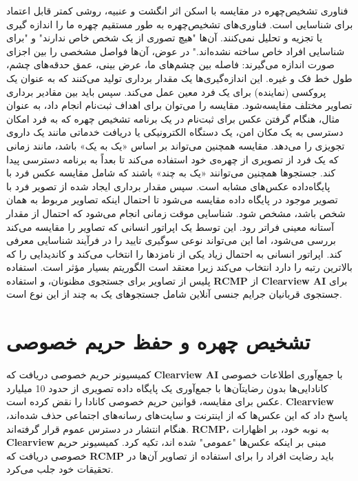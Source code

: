 فناوری تشخیص‌چهره در مقایسه با اسکن اثر انگشت و عنبیه، روشی کمتر قابل اعتماد برای شناسایی است.
فناوری‌های تشخیص‌چهره به طور مستقیم چهره ما را اندازه گیری یا تجزیه و تحلیل نمی‌کنند.
آن‌ها "هیچ تصوری از یک شخص خاص ندارند" و "برای شناسایی افراد خاص ساخته نشده‌اند." در عوض، آن‌ها فواصل مشخصی را بین اجزای صورت اندازه می‌گیرند: فاصله بین چشم‌های ما، عرض بینی، عمق حدقه‌های چشم، طول خط فک و غیره.
این اندازه‌گیری‌ها یک مقدار برداری تولید می‌کنند که به عنوان یک پروکسی (نماینده) برای یک فرد معین عمل می‌کند.
سپس باید بین مقادیر برداری تصاویر مختلف مقایسه‌شود.
مقایسه را می‌توان برای اهداف ثبت‌نام انجام داد، به عنوان مثال، هنگام گرفتن عکس برای ثبت‌نام در یک برنامه تشخیص چهره که به فرد امکان دسترسی به یک مکان امن، یک دستگاه الکترونیکی یا دریافت خدماتی مانند یک داروی تجویزی را می‌دهد.
مقایسه همچنین می‌تواند بر اساس «یک به یک» باشد، مانند زمانی که یک فرد از تصویری از چهره‌ی خود استفاده می‌کند تا بعداً به برنامه دسترسی پیدا کند.
جستجوها همچنین می‌توانند «یک به چند» باشند که شامل مقایسه عکس فرد با پایگاه‌داده عکس‌های مشابه است.
سپس مقدار برداری ایجاد شده از تصویر فرد با تصویر موجود در پایگاه داده مقایسه می‌شود تا احتمال اینکه تصاویر مربوط به همان شخص باشد، مشخص شود.
شناسایی موقت زمانی انجام می‌شود که احتمال از مقدار آستانه معینی فراتر رود.
این توسط یک اپراتور انسانی که تصاویر را مقایسه می‌کند بررسی می‌شود، اما این می‌تواند نوعی سوگیری تایید را در فرآیند شناسایی معرفی کند.
اپراتور انسانی به احتمال زیاد یکی از نامزدها را انتخاب می‌کند و کاندیدایی را که بالاترین رتبه را دارد انتخاب می‌کند زیرا معتقد است الگوریتم بسیار مؤثر است.
استفاده پلیس از تصاویر برای جستجوی مظنونان، و استفاده \textenglish{\textbf{RCMP}} از \textenglish{\textbf{Clearview AI}} برای جستجوی قربانیان جرایم جنسی آنلاین شامل جستجوهای یک به چند از این نوع است.
\newline
\newline


{
\section*{تشخیص چهره و حفظ حریم خصوصی}
\label{sec:تشخیص چهره و حفظ حریم خصوصی}
کمیسیونر حریم خصوصی دریافت که \textenglish{\textbf{Clearview AI}} با جمع‌آوری اطلاعات خصوصی کانادایی‌ها بدون رضایتآن‌ها با جمع‌آوری یک پایگاه داده تصویری از حدود 10 میلیارد عکس برای مقایسه، قوانین حریم خصوصی کانادا را نقض کرده است.
\textenglish{\textbf{Clearview}} پاسخ داد که این عکس‌ها که از اینترنت و سایت‌های رسانه‌های اجتماعی حذف شده‌اند، هنگام انتشار در دسترس عموم قرار گرفته‌اند.
\textenglish{\textbf{RCMP}}، به نوبه خود، بر اظهارات \textenglish{\textbf{Clearview}} مبنی بر اینکه عکس‌ها "عمومی" شده اند، تکیه کرد.
کمیسیونر حریم خصوصی دریافت که \textenglish{\textbf{RCMP}} باید رضایت افراد را برای استفاده از تصاویر آن‌ها در تحقیقات خود جلب می‌کرد.
}

